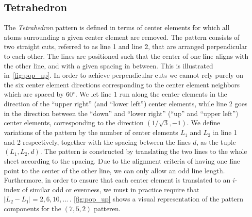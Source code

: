 \subsection{Tetrahedron}
The \textit{Tetrahedron} pattern is defined in terms of center elements for
which all atoms surrounding a given center element are removed. The pattern
consists of two straight cuts, referred to as line 1 and line 2, that are
arranged perpendicular to each other. The lines are positioned such that the
center of one line aligns with the other line, and with a given spacing in
between. This is illustrated in~\cref{fig:pop_up}. In order to achieve
perpendicular cuts we cannot rely purely on the six center element directions
corresponding to the center element neighbors which are spaced by 60$^\circ$. We
let line 1 run along the center elements in the direction of the ``upper right''
(and ``lower left'') center elements, while line 2 goes in the direction between
the ``down'' and ``lower right'' (``up'' and ``upper left'') center elements,
corresponding to the direction $(1/\sqrt{3}, -1)$. We define variations of the
pattern by the number of center elements $L_1$ and $L_2$ in line 1 and 2
respectively, together with the spacing between the lines $d$, as the tuple
$(L_1, L_2, d)$. The pattern is constructed by translating the two lines to the
whole sheet according to the spacing. Due to the alignment criteria of having
one line point to the center of the other line, we can only allow an odd line
length. Furthermore, in order to ensure that each center element is translated
to an $i$-index of similar odd or evenness, we must in practice require that
$|L_2 - L_1| = 2, 6, 10, \ldots \ $. \cref{fig:pop_up} shows a visual
representation of the pattern components for the $(7, 5, 2)$ patteren. 


